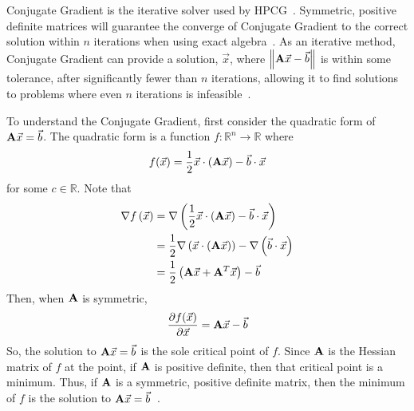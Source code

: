 Conjugate Gradient is the iterative solver used by HPCG~\cite{Dongarra:2015:HPCG}.
Symmetric, positive definite matrices will guarantee the converge of Conjugate Gradient to the correct solution within \(n\) iterations when using exact algebra~\cite{Saad:2003:IterativeMethods}.
As an iterative method, Conjugate Gradient can provide a solution, \(\vec{x}\), where \(\left\|\mathbf{A}\vec{x}-\vec{b}\right\|\) is within some tolerance, after significantly fewer than \(n\) iterations, allowing it to find solutions to problems where even \(n\) iterations is infeasible~\cite{Shewchuk:1994:IntroToCG}.

To understand the Conjugate Gradient, first consider the quadratic form of \(\mathbf{A}\vec{x} = \vec{b}\).
The quadratic form is a function \(f:\mathbb{R}^n\to\mathbb{R}\) where
\begin{equation}
\label{eq:quad-form}
	f(\vec{x}) = \frac{1}{2}\vec{x}\cdot\left(\mathbf{A}\vec{x}\right) - \vec{b}\cdot\vec{x}
\end{equation}
for some \(c\in\mathbb{R}\).
Note that
\begin{align*}
	\nabla f\left(\vec{x}\right)
	&= \nabla \left(\frac{1}{2}\vec{x}\cdot\left(\mathbf{A}\vec{x}\right) - \vec{b}\cdot\vec{x}\right) \\
	&= \frac{1}{2}\nabla \left(\vec{x}\cdot\left(\mathbf{A}\vec{x}\right)\right) - \nabla\left(\vec{b}\cdot\vec{x}\right) \\
	&= \frac{1}{2}\left(\mathbf{A}\vec{x}+\mathbf{A}^T\vec{x}\right)-\vec{b}
\end{align*}
Then, when \(\mathbf{A}\) is symmetric,
\begin{equation*}
	\frac{\partial f(\vec{x})}{\partial\vec{x}} = \mathbf{A}\vec{x} - \vec{b}
\end{equation*}
So, the solution to \(\mathbf{A}\vec{x} = \vec{b}\) is the sole critical point of \(f\).
Since \(\mathbf{A}\) is the Hessian matrix of \(f\) at the point, if \(\mathbf{A}\) is positive definite, then that critical point is a minimum.
Thus, if \(\mathbf{A}\) is a symmetric, positive definite matrix, then the minimum of \(f\) is the solution to \(\mathbf{A}\vec{x} = \vec{b}\)~\cite{Shewchuk:1994:IntroToCG}.

